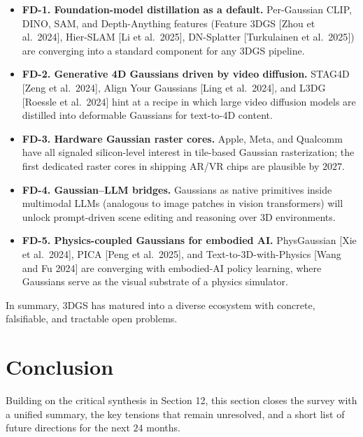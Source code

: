 \begin{itemize}
\tightlist
\item
  \textbf{FD-1. Foundation-model distillation as a default.} Per-Gaussian CLIP, DINO, SAM, and Depth-Anything features (Feature 3DGS {[}Zhou et al.~2024{]}, Hier-SLAM {[}Li et al.~2025{]}, DN-Splatter {[}Turkulainen et al.~2025{]}) are converging into a standard component for any 3DGS pipeline.
\item
  \textbf{FD-2. Generative 4D Gaussians driven by video diffusion.} STAG4D {[}Zeng et al.~2024{]}, Align Your Gaussians {[}Ling et al.~2024{]}, and L3DG {[}Roessle et al.~2024{]} hint at a recipe in which large video diffusion models are distilled into deformable Gaussians for text-to-4D content.
\item
  \textbf{FD-3. Hardware Gaussian raster cores.} Apple, Meta, and Qualcomm have all signaled silicon-level interest in tile-based Gaussian rasterization; the first dedicated raster cores in shipping AR/VR chips are plausible by \(2027\).
\item
  \textbf{FD-4. Gaussian--LLM bridges.} Gaussians as native primitives inside multimodal LLMs (analogous to image patches in vision transformers) will unlock prompt-driven scene editing and reasoning over 3D environments.
\item
  \textbf{FD-5. Physics-coupled Gaussians for embodied AI.} PhysGaussian {[}Xie et al.~2024{]}, PICA {[}Peng et al.~2025{]}, and Text-to-3D-with-Physics {[}Wang and Fu 2024{]} are converging with embodied-AI policy learning, where Gaussians serve as the visual substrate of a physics simulator.
\end{itemize}

In summary, 3DGS has matured into a diverse ecosystem with concrete, falsifiable, and tractable open problems.

\section{Conclusion}\label{conclusion}

Building on the critical synthesis in Section 12, this section closes the survey with a unified summary, the key tensions that remain unresolved, and a short list of future directions for the next \(24\) months.

